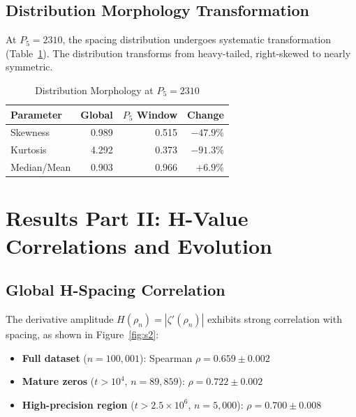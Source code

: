 \documentclass[12pt]{article}
\begin{document}
\subsection{Distribution Morphology Transformation}

At $P_5 = 2310$, the spacing distribution undergoes systematic transformation (Table~\ref{tab:morphology}). The distribution transforms from heavy-tailed, right-skewed to nearly symmetric.

\begin{table}[htbp]
\centering
\caption{Distribution Morphology at $P_5 = 2310$}
\label{tab:morphology}
\begin{tabular}{@{}lrrr@{}}
\toprule
Parameter & Global & $P_5$ Window & Change \\
\midrule
Skewness & 0.989 & 0.515 & $-47.9\%$ \\
Kurtosis & 4.292 & 0.373 & $-91.3\%$ \\
Median/Mean & 0.903 & 0.966 & $+6.9\%$ \\
\bottomrule
\end{tabular}
\end{table}

\section{Results Part II: H-Value Correlations and Evolution}

\subsection{Global H-Spacing Correlation}

The derivative amplitude $H(\rho_n) = |\zeta'(\rho_n)|$ exhibits
strong correlation with spacing, as shown in Figure~\ref{fig:s2}:

\begin{itemize}
\item \textbf{Full dataset} ($n = 100{,}001$): Spearman $\rho = 0.659 \pm 0.002$

\item \textbf{Mature zeros} ($t > 10^4$, $n = 89{,}859$): $\rho = 0.722 \pm 0.002$

\item \textbf{High-precision region} ($t > 2.5 \times 10^6$, $n = 5{,}000$): $\rho = 0.700 \pm 0.008$
\end{itemize}
\end{document}
